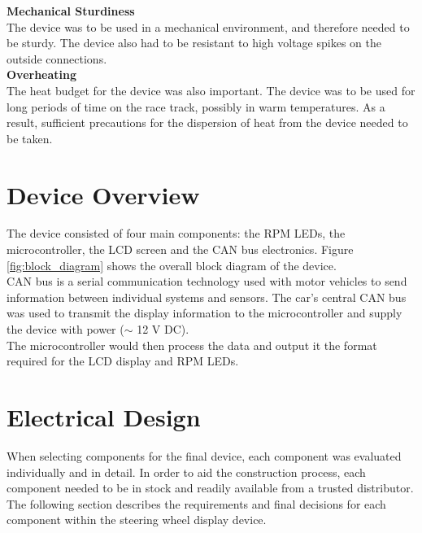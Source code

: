 \documentclass[a4paper,12pt]{article}
\begin{document}
\textbf{Mechanical Sturdiness} \\

The device was to be used in a mechanical environment, and therefore needed to be sturdy. The device also had to be resistant to high voltage spikes on the outside connections. \\

\textbf{Overheating} \\

The heat budget for the device was also important. The device was to be used for long periods of time on the race track, possibly in warm temperatures. As a result, sufficient precautions for the dispersion of heat from the device needed to be taken.


\newpage
\section{Device Overview}
\label{sec:device_overview}

The device consisted of four main components: the RPM LEDs, the microcontroller, the LCD screen and the CAN bus electronics. Figure \ref{fig:block_diagram} shows the overall block diagram of the device. \\



CAN bus is a serial communication technology used with motor vehicles to send information between individual systems and sensors. The car's central CAN bus was used to transmit the display information to the microcontroller and supply the device with power ($\sim$ 12 V DC). \\

The microcontroller would then process the data and output it the format required for the LCD display and RPM LEDs. \\


\newpage
\section{Electrical Design}
\label{sec:electrical_design}

When selecting components for the final device, each component was evaluated individually and in detail. In order to aid the construction process, each component needed to be in stock and readily available from a trusted distributor. The following section describes the requirements and final decisions for each component within the steering wheel display device. \\
\end{document}
